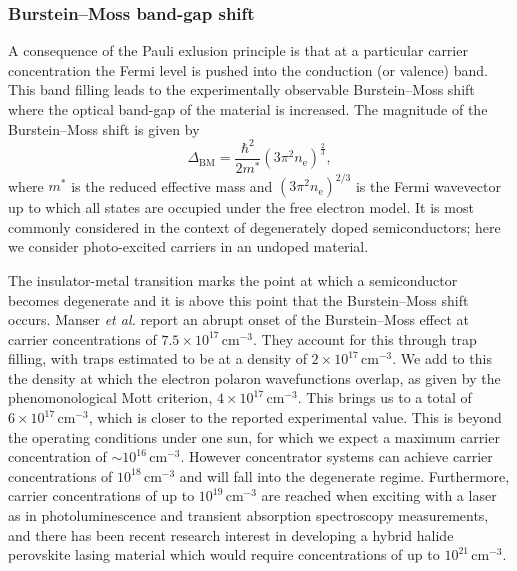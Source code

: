 \subsubsection{Burstein--Moss band-gap shift}

A consequence of the Pauli exlusion principle is that at a particular carrier concentration the Fermi level is pushed into the conduction (or valence) band. 
This band filling leads to the experimentally observable Burstein--Moss shift where the optical band-gap of the material is increased.
The magnitude of the Burstein--Moss shift is given by 
\begin{equation} \label{parabolic_shift}
\Delta_{\text{BM}} =\frac{\hbar^2}{2m^*}(3\pi^2n_{\text{e}})^{\frac{2}{3}},
\end{equation}
where $m^*$ is the reduced effective mass and $(3\pi^2n_{\text{e}})^{2/3}$ is the Fermi wavevector up to which all states are occupied under the free electron model. 
It is most commonly considered in the context of degenerately doped semiconductors; here we consider photo-excited carriers in an undoped material.

The insulator-metal transition marks the point at which a semiconductor becomes degenerate and it is above this point that the Burstein--Moss shift occurs.
Manser \textit{et al.} report an abrupt onset of the Burstein--Moss effect at carrier concentrations of $7.5\!\times\!10^{17}\,\mathrm{cm}^{-3}$.\autocite{Manser2014}
They account for this through trap filling, with traps estimated to be at a density of $2\!\times\!10^{17}\,\mathrm{cm}^{-3}$.
We add to this the density at which the electron polaron wavefunctions overlap, as given by the phenomonological Mott criterion\autocite{Mott1949}, $4\!\times\!10^{17}\,\mathrm{cm}^{-3}$.\autocite{Frost2017} 
This brings us to a total of $6\!\times\!10^{17}\,\mathrm{cm}^{-3}$, which is closer to the reported experimental value. 
This is beyond the operating conditions under one sun, for which we expect a maximum carrier concentration of $\sim10^{16}\,\mathrm{cm}^{-3}$.\autocite{Herz2016} 
However concentrator systems can achieve carrier concentrations of $10^{18}\,\mathrm{cm}^{-3}$ \autocite{Law2014} and will fall into the degenerate regime.
Furthermore, carrier concentrations of up to $10^{19}\,\mathrm{cm}^{-3}$ are reached when exciting with a laser as in photoluminescence and transient absorption spectroscopy measurements,\autocite{Richter2016}
and there has been recent research interest in developing a hybrid halide perovskite lasing material which would require concentrations of up to $10^{21}\,\mathrm{cm}^{-3}$.\autocite{Gao2017}

